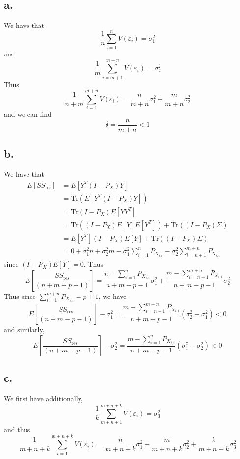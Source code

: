 \documentclass[11pt]{article}
\theoremstyle{mystyle}
\theoremstyle{definition}
\begin{document}
\subsection*{a.}
We have that 
\[
  \displaystyle\frac{1}{n} \sum_{i=1}^n V(\varepsilon_i) = \sigma_1^2
\]
and
\[
  \displaystyle\frac{1}{m} \sum_{i=m+1}^{m+n} V(\varepsilon_i) = \sigma_2^2
\]
Thus 
\[
  \displaystyle\frac{1}{n+m} \sum_{i=1}^{m+n} V(\varepsilon_i) = \displaystyle\frac{n}{m+n} \sigma_1^2 + \displaystyle\frac{m}{m+n} \sigma_2^2
\]
and we can find 
\[
  \delta = \displaystyle\frac{n}{m+n} < 1
\]
\subsection*{b.}
We have that 
\begin{align*} 
  E[SS_{\text{res}}] &= E[Y^T (I-P_X)Y]  \\
  &= \text{Tr}(E[Y^T (I-P_X)Y]) \\
  &= \text{Tr}(I-P_X) E[YY^T] \\
  &= \text{Tr}((I-P_X)E[Y]E[Y^T]) + \text{Tr}((I-P_X)\Sigma)  \\
  &= E[Y^T] (I-P_X)E[Y] + \text{Tr} ((I-P_X) \Sigma) \\
  &= 0 + \sigma_1^2 n + \sigma_2^2 m - \sigma_1^2 \sum_{i=1}^n P_{X_{i,i}} - \sigma_2^2 \sum_{i=n+1}^{m+n} P_{X_{i,i}}
\end{align*}
since $(I-P_X)E[Y]= 0$. 
Thus 
\[
  E\left[\frac{SS_{\text{res}}}{(n+m-p-1)}\right] = \displaystyle\frac{n- \sum_{i=1}^n P_{X_{i,i}}}{n+m-p-1}\sigma_1^2 + \displaystyle\frac{m-\sum_{i=n+1}^{m+n} P_{X_{i,i}}}{n+m-p-1} \sigma_2^2  
\]
Thus since $\sum_{i=1}^{m+n} P_{X_{i,i}} = p+1$, we have 
\[
  E\left[\frac{SS_{\text{res}}}{(n+m-p-1)}\right] - \sigma_1^2 =   \displaystyle\frac{m-\sum_{i=n+1}^{m+n} P_{X_{i,i}}}{n+m-p-1} (\sigma_2^2 -\sigma_1^2) < 0
\]
and similarly, 
\[
  E\left[\frac{SS_{\text{res}}}{(n+m-p-1)}\right] - \sigma_2^2 =   \displaystyle\frac{m-\sum_{i=1}^{n} P_{X_{i,i}}}{n+m-p-1} (\sigma_1^2 -\sigma_2^2) < 0
\]
\subsection*{c.}
We first have additionally, 
\[
  \displaystyle\frac{1}{k} \sum_{m+n+1}^{m+n+k} V(\varepsilon_i) = \sigma_3^2
\]
and thus 
\[
  \displaystyle\frac{1}{m+n+k} \sum_{i=1}^{m+n+k}V(\varepsilon_i) = \displaystyle\frac{n}{m+n+k} \sigma_1^2 + \displaystyle\frac{m}{m+n+k}\sigma_2^2 + \displaystyle\frac{k}{m+n+k}\sigma_3^2
\]
\end{document}
